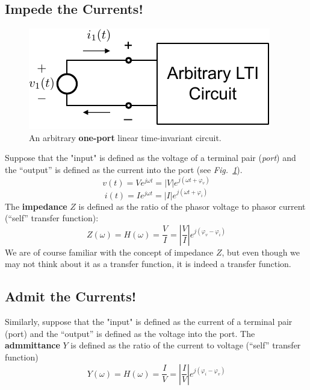 \subsection{Impede the Currents!}
\begin{figure}[tb]
\centering
\includegraphics[width=.5\columnwidth]{mod1_3_2_oneport}
\caption{An arbitrary \textbf{one-port} linear time-invariant circuit.}
\label{fig:oneport}
\end{figure}
Suppose that the "input" is defined as the voltage of a terminal pair (\textit{port}) and the “output” is defined as the current into the port (see \emph{Fig.~\ref{fig:oneport}}).  
    \begin{equation}
        v(t) = V{e^{j\omega t}} = \left| V \right|{e^{j(\omega t + {\varphi _v})}}
    \end{equation}
    \begin{equation}
        i(t) = I{e^{j\omega t}} = \left| I \right|{e^{j(\omega t + {\varphi _i})}}
    \end{equation}
The \textbf{impedance} $Z$ is defined as the ratio of the phasor voltage to phasor current (“self” transfer function):
    \begin{equation}
        Z(\omega ) = H(\omega ) = \frac{V}{I} = \left| {\frac{V}{I}} \right|{e^{j({\varphi _v} - {\varphi _i})}}
    \end{equation}
We are of course familiar with the concept of impedance $Z$, but even though we may not think about it as a transfer function, it is indeed a transfer function.
\subsection{Admit the Currents!}
Similarly, suppose that the "input" is defined as the current of a terminal pair (port) and the “output” is defined as the voltage into the port. The \textbf{admmittance} $Y$ is defined as the ratio of the current to voltage (“self” transfer function)
    \begin{equation}
        Y(\omega ) = H(\omega ) = \frac{I}{V} = \left| {\frac{I}{V}} \right|{e^{j({\varphi _i} - {\varphi _v})}}
    \end{equation}
